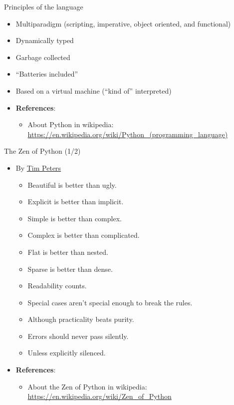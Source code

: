 \documentclass{beamer}
\begin{document}
\begin{frame}
{\centerline{Principles of the language}}
\begin{itemize}
    \item Multiparadigm (scripting, imperative, object oriented, and functional)
    \item Dynamically typed
    \item Garbage collected
    \item ``Batteries included'' 
    \item Based on a virtual machine (``kind of'' interpreted)
\end{itemize} 

{\tiny
{}
\begin{itemize}
\item \textbf{References}:
\begin{itemize}
\item About Python in wikipedia: \url{https://en.wikipedia.org/wiki/Python_(programming_language)}
\end{itemize}
\end{itemize}
}
\end{frame}

\begin{frame}
{\centerline{The Zen of Python (1/2)}}
\begin{itemize}
    \item By \href{https://en.wikipedia.org/wiki/Zen_of_Python}{Tim Peters}
    \begin{itemize}
    \item Beautiful is better than ugly.
    \item Explicit is better than implicit.
    \item Simple is better than complex.
    \item Complex is better than complicated.
    \item Flat is better than nested.
    \item Sparse is better than dense.
    \item Readability counts.
    \item Special cases aren't special enough to break the rules.
    \item Although practicality beats purity.
    \item Errors should never pass silently.
    \item Unless explicitly silenced.
    \end{itemize} 
\end{itemize} 

{\tiny
{}
\begin{itemize}
\item \textbf{References}:
\begin{itemize}
\item About the Zen of Python in wikipedia: \url{https://en.wikipedia.org/wiki/Zen_of_Python}
\end{itemize}
\end{itemize}
}
\end{frame}
\end{document}
